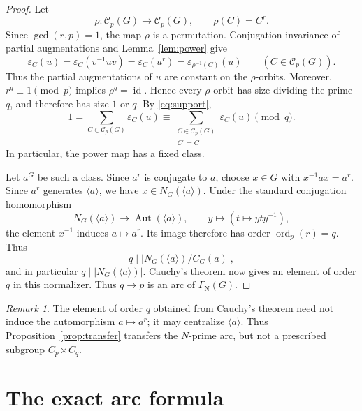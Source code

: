 \documentclass[11pt,a4paper]{article}
\theoremstyle{remark}
\newtheorem{remark}[theorem]{Remark}
\newcommand{\GN}{\Gamma_{\mathrm N}}
\newcommand{\Aut}{\operatorname{Aut}}
\newcommand{\eps}{\varepsilon}
\begin{document}
\begin{proof}
Let
\[
 \rho\colon\mathcal C_p(G)\longrightarrow\mathcal C_p(G),
 \qquad \rho(C)=C^r.
\]
Since $\gcd(r,p)=1$, the map $\rho$ is a permutation. Conjugation
invariance of partial augmentations and Lemma~\ref{lem:power} give
\[
 \eps_C(u)
 =
 \eps_C(v^{-1}uv)
 =
 \eps_C(u^r)
 =
 \eps_{\rho^{-1}(C)}(u)
 \qquad(C\in\mathcal C_p(G)).
\]
Thus the partial augmentations of $u$ are constant on the $\rho$-orbits.
Moreover, $r^q\equiv1\pmod p$ implies $\rho^q=\operatorname{id}$. Hence
every $\rho$-orbit has size dividing the prime $q$, and therefore has size
$1$ or $q$. By \eqref{eq:support},
\[
 1
 =
 \sum_{C\in\mathcal C_p(G)}\eps_C(u)
 \equiv
 \sum_{\substack{C\in\mathcal C_p(G)\\ C^r=C}}
 \eps_C(u)
 \pmod q.
\]
In particular, the power map has a fixed class.

Let $a^G$ be such a class. Since $a^r$ is conjugate to $a$, choose $x\in G$
with $x^{-1}ax=a^r$. Since $a^r$ generates $\langle a\rangle$, we have
$x\in N_G(\langle a\rangle)$. Under the standard conjugation homomorphism
\[
 N_G(\langle a\rangle)\longrightarrow
 \Aut(\langle a\rangle),
 \qquad y\longmapsto(t\longmapsto yty^{-1}),
\]
the element $x^{-1}$ induces $a\mapsto a^r$. Its image therefore has order
$\operatorname{ord}_p(r)=q$. Thus
\[
 q\mid\bigl|N_G(\langle a\rangle)/C_G(a)\bigr|,
\]
and in particular $q\mid |N_G(\langle a\rangle)|$. Cauchy's theorem now
gives an element of order $q$ in this normalizer. Thus $q\to p$ is an arc
of $\GN(G)$.
\end{proof}

\begin{remark}
The element of order $q$ obtained from Cauchy's theorem need not induce the
automorphism $a\mapsto a^r$; it may centralize $\langle a\rangle$. Thus
Proposition~\ref{prop:transfer} transfers the $N$-prime arc, but not a
prescribed subgroup $C_p\rtimes C_q$.
\end{remark}

\section{The exact arc formula}
\end{document}
